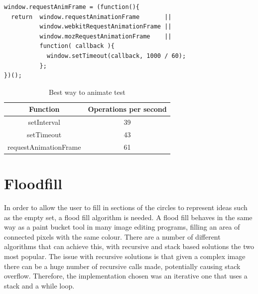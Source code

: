 \documentclass[12pt,a4paper]{report}
\begin{document}
\begin{lstlisting}
window.requestAnimFrame = (function(){
  return  window.requestAnimationFrame       ||
          window.webkitRequestAnimationFrame ||
          window.mozRequestAnimationFrame    ||
          function( callback ){
            window.setTimeout(callback, 1000 / 60);
          };
})();
\end{lstlisting}


\begin{table}[ht]
\centering
\begin{adjustbox}{width=1\textwidth}
\small
\begin{tabular}{ c | c }
  \hline
 Function & Operations per second \\ \hline 
    setInterval & 39 \\
    setTimeout & 43 \\
    requestAnimationFrame & 61 \\
   \hline
\end{tabular}
\end{adjustbox}
\caption{Best way to animate test} 
\end{table} 

\section{Floodfill}
In order to allow the user to fill in sections of the circles to represent ideas such as the empty set, a flood fill algorithm is needed. A flood fill behaves in the same way as a paint bucket tool in many image editing programs, filling an area of connected pixels with the same colour. There are a number of different algorithms that can achieve this, with recursive and stack based solutions the two most popular. The issue with recursive solutions is that given a complex image there can be a huge number of recursive calls made, potentially causing stack overflow. 
Therefore, the implementation chosen was an iterative one that uses a stack and a while loop.
\end{document}
